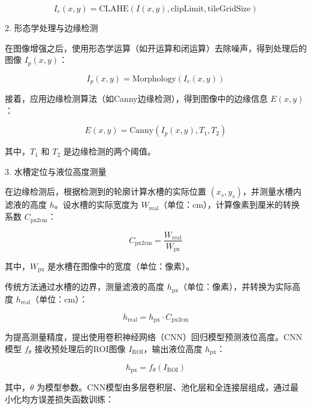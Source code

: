 \begin{equation}
I_e(x, y) = \text{CLAHE}(I(x, y), \text{clipLimit}, \text{tileGridSize})
\end{equation}

2. 形态学处理与边缘检测

在图像增强之后，使用形态学运算（如开运算和闭运算）去除噪声\textsuperscript{\cite{ref19}}，得到处理后的图像 \( I_p(x, y) \)：

\begin{equation}
I_p(x, y) = \text{Morphology}(I_e(x, y))
\end{equation}

接着，应用边缘检测算法\textsuperscript{\cite{ref16,ref17}}（如Canny边缘检测），得到图像中的边缘信息 \( E(x, y) \)：

\begin{equation}
E(x, y) = \text{Canny}(I_p(x, y), T_1, T_2)
\end{equation}

其中，\( T_1 \) 和 \( T_2 \) 是边缘检测的两个阈值。

3. 水槽定位与液位高度测量

在边缘检测后，根据检测到的轮廓计算水槽的实际位置 \( (x_s, y_s) \)，并测量水槽内滤液的高度 \( h \)。设水槽的实际宽度为 \( W_{\text{real}} \)（单位：cm），计算像素到厘米的转换系数 \( C_{\text{px2cm}} \)：

\begin{equation}
C_{\text{px2cm}} = \frac{W_{\text{real}}}{W_{\text{px}}}
\end{equation}

其中，\( W_{\text{px}} \) 是水槽在图像中的宽度（单位：像素）。

传统方法通过水槽的边界，测量滤液的高度 \( h_{\text{px}} \)（单位：像素），并转换为实际高度 \( h_{\text{real}} \)（单位：cm）：

\begin{equation}
h_{\text{real}} = h_{\text{px}} \cdot C_{\text{px2cm}}
\end{equation}

为提高测量精度，提出使用卷积神经网络\textsuperscript{\cite{ref20,ref21}}（CNN）回归模型预测液位高度。CNN模型 \( f_{\theta} \) 接收预处理后的ROI图像 \( I_{\text{ROI}} \)，输出液位高度 \( h_{\text{px}} \)：

\begin{equation}
h_{\text{px}} = f_{\theta}(I_{\text{ROI}})
\end{equation}

其中，\( \theta \) 为模型参数。CNN模型由多层卷积层、池化层和全连接层组成，通过最小化均方误差损失函数训练：

